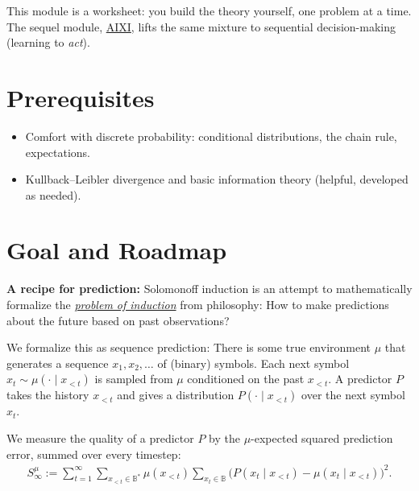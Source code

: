 \documentclass[fontsize=11pt, parskip=half]{scrartcl}
\begin{document}
This module is a worksheet: you build the theory yourself, one problem at a time.
The sequel module, \href{/agency/aixi}{AIXI}, lifts the same mixture to sequential
decision-making (learning to \emph{act}).

\section*{Prerequisites}

\begin{itemize}
    \item Comfort with discrete probability: conditional distributions, the chain
    rule, expectations.
    \item Kullback--Leibler divergence and basic information theory (helpful,
    developed as needed).
\end{itemize}

\section*{Goal and Roadmap}

\textbf{A recipe for prediction:} Solomonoff induction is an attempt to mathematically
formalize the \href{https://en.wikipedia.org/wiki/Problem_of_induction}{\emph{problem of induction}}
from philosophy: How to make predictions about the future based on past observations?

We formalize this as sequence prediction: There is some true environment $\mu$ that generates
a sequence $x_1, x_2, \dots$ of (binary) symbols. Each next symbol $x_t \sim \mu(\cdot \mid x_{<t})$ is sampled
from $\mu$ conditioned on the past $x_{<t}$. A predictor $P$ takes the history $x_{<t}$ and gives a 
distribution $P(\cdot \mid x_{<t})$ over the next symbol $x_t$. 

We measure the quality of a predictor $P$ by the $\mu$-expected squared prediction error, summed over every timestep:
\begin{align}
S_\infty^\mu := \sum_{t=1}^{\infty} \sum_{x_{<t} \in \mathbb{B}^*} \mu(x_{<t}) \sum_{x_t \in \mathbb{B}} \big( P(x_t \mid x_{<t}) - \mu(x_t \mid x_{<t}) \big)^2.
\end{align}
\end{document}
